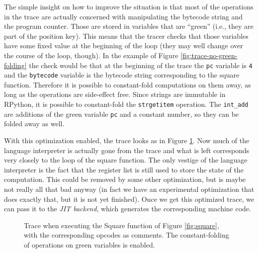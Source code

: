 \documentclass{sig-alternate}
\newcommand\ie{i.e.,\xspace}
\begin{document}
The simple insight on how to improve the situation is that most of the operations
in the trace are actually concerned with manipulating the bytecode string and
the program counter. Those are stored in variables that are ``green'' (\ie they
are part of the position key).  This means that the tracer checks that those
variables have some fixed value at the beginning of the loop (they may well
change over the course of the loop, though). In the example of Figure
\ref{fig:trace-no-green-folding} the check would be that at the beginning of the
trace the \texttt{pc} variable is \texttt{4} and the \texttt{bytecode} variable
is the bytecode string corresponding to the square function. Therefore it is
possible to constant-fold computations on them away,
as long as the operations are side-effect free. Since strings are immutable in
RPython, it is possible to constant-fold the \texttt{strgetitem} operation. The
\texttt{int\_add} are additions of the green variable \texttt{pc} and a constant
number, so they can be folded away as well.

With this optimization enabled, the trace looks as in Figure
\ref{fig:trace-full}. Now much of the language interpreter is actually gone
from the trace and what is left corresponds very closely to the loop of the
square function. The only vestige of the language interpreter is the fact that
the register list is still used to store the state of the computation. This
could be removed by some other optimization, but is maybe not really all that
bad anyway (in fact we have an experimental optimization that does exactly that,
but it is not yet finished).  Once we get this optimized trace, we can pass it to
the \emph{JIT backend}, which generates the corresponding machine code.

\begin{figure}

\caption{Trace when executing the Square function of Figure \ref{fig:square},
with the corresponding opcodes as comments. The constant-folding of operations
on green variables is enabled.}
\label{fig:trace-full}
\end{figure}


\end{document}
